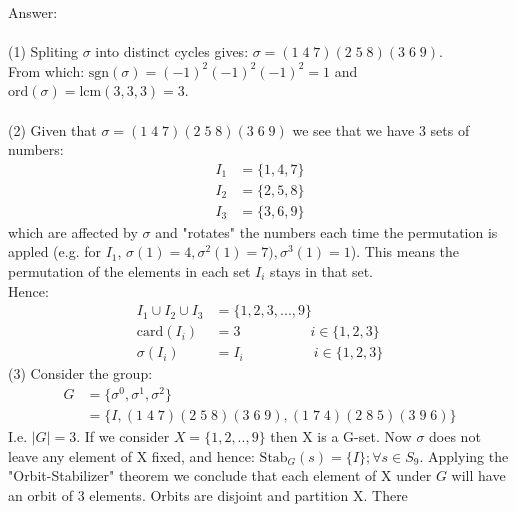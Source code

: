 \documentclass[12pt,a4paper]{article}
\begin{document}
\vspace{1cm}
\noindent
Answer:\\
\\
(1) Spliting $\sigma$ into distinct cycles gives: $\sigma=(1 \; 4 \; 7)(2 \; 5 \; 8)(3 \; 6 \; 9)$.\\
From which: $\text{sgn}(\sigma)=(-1)^2(-1)^2(-1)^2=1$ and $\text{ord}(\sigma)=\text{lcm}(3,3,3)=3$.\\
\\
(2) Given that $\sigma=(1 \; 4 \; 7)(2 \; 5 \; 8)(3 \; 6 \; 9)$ we see that we have 3 sets of numbers:
\begin{align*}
  I_1 &= \{1,4,7 \} \\
  I_2 &= \{2,5,8 \} \\
  I_3 & =\{3,6,9 \}
\end{align*}
which are affected by $\sigma$ and "rotates" the numbers each time the permutation is appled (e.g. for $I_1$, $\sigma(1)=4, \sigma^2(1)=7), \sigma^3(1)=1$).  This means the permutation of the elements in each set $I_i$ stays in that set.\\
Hence: 
\begin{align*}
  I_1 \cup I_2 \cup I_3 &= \{1,2,3,...,9\} \\
  \text{card}(I_i) &= 3 \;\;\;\;\;\;\;\;\;\;\;\;\;\;\;\;\;\; i \in \{1,2,3\}\\
  \sigma(I_i) &= I_i \;\;\;\;\;\;\;\;\;\;\;\;\;\;\;\;\;\; i \in \{1,2,3\}
\end{align*}
(3) Consider the group:
\begin{align*}
  G &= \{\sigma^0, \sigma^1, \sigma^2 \} \\
    &= \{I, (1 \; 4 \; 7)(2 \; 5 \; 8)(3 \; 6 \; 9), (1 \; 7 \; 4)(2 \; 8 \; 5)(3 \; 9 \; 6) \}
\end{align*}
I.e. $|G|=3$.  If we consider $X=\{1,2,..,9\}$ then X is a G-set.  Now $\sigma$ does not leave any element of 
X fixed, and hence: $\text{Stab}_G(s) = \{I\}; \forall s \in S_9$.  Applying the "Orbit-Stabilizer" theorem we conclude that each element of
X under $G$ will have an orbit of 3 elements.  Orbits are disjoint and partition X.  There
\end{document}
